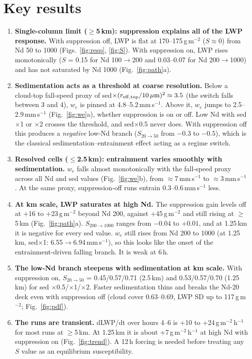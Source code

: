 \documentclass[10pt]{article}
\begin{document}
\section*{Key results}
\begin{enumerate}
\item \textbf{Single-column limit ($\geq$5\,km): suppression explains all of the LWP response.} With suppression off, LWP is flat at 170--175\,g\,m$^{-2}$ ($S\approx0$)
from Nd 50 to 1000 (Figs.~\ref{fig:resp}, \ref{fig:S}). With suppression on, LWP rises monotonically
($S$ = 0.15 for Nd 100$\to$200 and 0.03--0.07 for Nd 200$\to$1000) and has not saturated by Nd 1000 (Fig.~\ref{fig:path}a).
\item \textbf{Sedimentation acts as a threshold at coarse resolution.} Below a cloud-top fall-speed proxy of
sed$\times(r_{\rm eff,top}/10\,\mu{\rm m})^2\approx3.5$ (the switch falls between 3 and 4), $w_e$ is pinned at 4.8--5.2\,mm\,s$^{-1}$. Above it, $w_e$ jumps to 2.5--2.9\,mm\,s$^{-1}$
(Fig.~\ref{fig:we}a), whether suppression is on or off. Low Nd with sed$\times$1 or $\times$2 crosses the threshold, and sed$\times$0.5 never does.
With suppression off this produces a \emph{negative} low-Nd branch ($S_{20\to50}$ from $-0.3$ to $-0.5$), which is the classical
sedimentation--entrainment effect acting as a regime switch.
\item \textbf{Resolved cells ($\leq$2.5\,km): entrainment varies smoothly with sedimentation.} $w_e$ falls almost monotonically with the fall-speed proxy across
all Nd and sed values (Fig.~\ref{fig:we}b), from $\approx$7\,mm\,s$^{-1}$ to $\approx$3\,mm\,s$^{-1}$. At the same proxy, suppression-off runs
entrain 0.3--0.6\,mm\,s$^{-1}$ less.
\item \textbf{At km scale, LWP saturates at high Nd.} The suppression gain levels off at +16 to +23\,g\,m$^{-2}$ beyond Nd 200,
against +45\,g\,m$^{-2}$ and still rising at $\geq$5\,km (Fig.~\ref{fig:path}a). $S_{200\to1000}$ ranges from $-0.04$ to $+0.01$, and at 1.25\,km it is
negative for every sed value. $w_e$ still rises from Nd 200 to 1000 (at 1.25\,km, sed$\times$1: 6.55$\to$6.94\,mm\,s$^{-1}$), so this
looks like the onset of the entrainment-driven falling branch. It is weak at 6\,h.
\item \textbf{The low-Nd branch steepens with sedimentation at km scale.} With suppression on, $S_{20\to50}$ = 0.45/0.57/0.71 (2.5\,km) and 0.53/0.57/0.70 (1.25\,km) for sed $\times$0.5/$\times$1/$\times$2.
Faster sedimentation thins and breaks the Nd-20 deck even with suppression off (cloud cover 0.63--0.69, LWP SD up to 117\,g\,m$^{-2}$; Fig.~\ref{fig:pdf}).
\item \textbf{The runs are transient.} dLWP/dt over hours 4--6 is +10 to +24\,g\,m$^{-2}$\,h$^{-1}$ for most runs at $\geq$5\,km. At 1.25\,km it is about +7\,g\,m$^{-2}$\,h$^{-1}$ at high Nd with suppression on (Fig.~\ref{fig:trend}).
A 12\,h forcing is needed before treating any $S$ value as an equilibrium susceptibility.
\end{enumerate}
\end{document}
